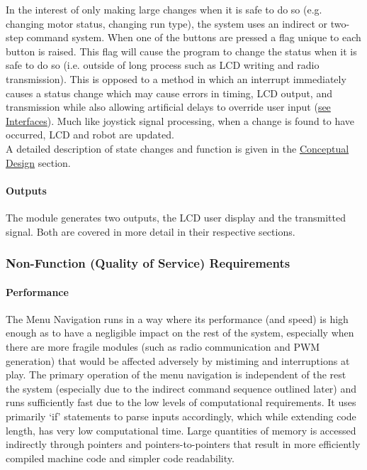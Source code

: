 \documentclass[MTRX3700report.tex]{subfiles}
\begin{document}
	In the interest of only making large changes when it is safe to do so (e.g. changing motor status, changing run type), the system uses an indirect or two-step command system. When one of the buttons are pressed a flag unique to each button is raised. This flag will cause the program to change the status when it is safe to do so (i.e. outside of long process such as LCD writing and radio transmission). This is opposed to a method in which an interrupt immediately causes a status change which may cause errors in timing, LCD output, and transmission while also allowing artificial delays to override user input (\underline{see Interfaces}). Much like joystick signal processing, when a change is found to have occurred, LCD and robot are updated.\\
	
	A detailed description of state changes and function is given in the \underline{Conceptual Design} section.
	
	
	\paragraph{Outputs}
	
	The module generates two outputs, the LCD user display and the transmitted signal. Both are covered in more detail in their respective sections.

	
	\subsubsection{Non-Function (Quality of Service) Requirements}

	\paragraph{Performance}
	
	The Menu Navigation runs in a way where its performance (and speed) is high enough as to have a negligible impact on the rest of the system, especially when there are more fragile modules (such as radio communication and PWM generation) that would be affected adversely by mistiming and interruptions at play. The primary operation of the menu navigation is independent of the rest the system (especially due to the indirect command sequence outlined later) and runs sufficiently fast due to the low levels of computational requirements. It uses primarily `if' statements to parse inputs accordingly, which while extending code length, has very low computational time. Large quantities of memory is accessed indirectly through pointers and pointers-to-pointers that result in more efficiently compiled machine code and simpler code readability.
	
\end{document}
